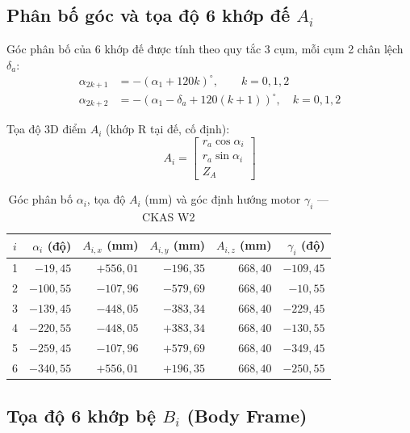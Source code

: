 \documentclass[12pt,a4paper]{article}
\begin{document}
\subsection{Phân bố góc và tọa độ 6 khớp đế $A_i$}

Góc phân bố của 6 khớp đế được tính theo quy tắc 3 cụm, mỗi cụm 2 chân lệch $\delta_a$:
\begin{align}
  \alpha_{2k+1} &= -(\alpha_1 + 120k)^{\circ}, \qquad k = 0{,}1{,}2 \label{eq:alpha_odd}\\
  \alpha_{2k+2} &= -(\alpha_1 - \delta_a + 120(k+1))^{\circ}, \quad k = 0{,}1{,}2 \label{eq:alpha_even}
\end{align}

Tọa độ 3D điểm $A_i$ (khớp R tại đế, cố định):
\begin{equation}
  A_i = \begin{bmatrix} r_a\cos\alpha_i \\ r_a\sin\alpha_i \\ Z_A \end{bmatrix}
  \label{eq:Ai}
\end{equation}

\begin{table}[H]\centering
\caption{Góc phân bố $\alpha_i$, tọa độ $A_i$ (mm) và góc định hướng motor $\gamma_i$ --- CKAS W2}
\label{tab:Ai}
\begin{tabular}{@{}c r r r r r@{}}
\toprule
$i$ & $\alpha_i$ (độ) & $A_{i,x}$ (mm) & $A_{i,y}$ (mm) & $A_{i,z}$ (mm) & $\gamma_i$ (độ) \\
\midrule
1 & $-19{,}45$   & $+556{,}01$  & $-196{,}35$  & $668{,}40$ & $-109{,}45$ \\
2 & $-100{,}55$  & $-107{,}96$  & $-579{,}69$  & $668{,}40$ & $-10{,}55$  \\
3 & $-139{,}45$  & $-448{,}05$  & $-383{,}34$  & $668{,}40$ & $-229{,}45$ \\
4 & $-220{,}55$  & $-448{,}05$  & $+383{,}34$  & $668{,}40$ & $-130{,}55$ \\
5 & $-259{,}45$  & $-107{,}96$  & $+579{,}69$  & $668{,}40$ & $-349{,}45$ \\
6 & $-340{,}55$  & $+556{,}01$  & $+196{,}35$  & $668{,}40$ & $-250{,}55$ \\
\bottomrule
\end{tabular}
\end{table}

\subsection{Tọa độ 6 khớp bệ $B_i$ (Body Frame)}
\end{document}
